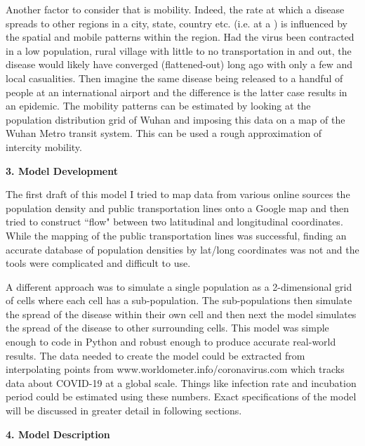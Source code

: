 \documentclass[a4paper]{article}
\begin{document}
Another factor to consider that 
is mobility. Indeed, the rate at which a disease spreads to other regions
in a city, state, country etc. (i.e. at a ) is influenced by the spatial 
and mobile patterns within the region. Had the virus been contracted in a low
population, rural village with little to no transportation in and out, the
disease would likely have converged (flattened-out) long ago with only a few 
and local casualities. Then imagine the same disease being released to a handful
of people at an international airport and the difference is the latter case
results in an epidemic. The mobility patterns can be estimated by looking at the
population distribution grid of Wuhan and imposing this data on a map of the
Wuhan Metro transit system. This can be used a rough approximation of intercity
mobility.

\begin{center}
  \textbf{3. Model Development}
\end{center}

The first draft of this model I tried to map data from various online sources the
population density and public transportation lines onto a Google map and then tried
to construct ``flow" between two latitudinal and longitudinal coordinates. While
the mapping of the public transportation lines was successful, finding an
accurate database of population densities by lat/long coordinates was not and
the tools were complicated and difficult to use. 

A different approach was to simulate a single population as a 2-dimensional grid
of cells where each cell has a sub-population. The sub-populations then simulate
the spread of the disease within their own cell and then next the model simulates
the spread of the disease to other surrounding cells. This model was simple
enough to code in Python and robust enough to produce accurate real-world
results. The data needed to create the model could be extracted from
interpolating points from www.worldometer.info/coronavirus.com which tracks data
about COVID-19 at a global scale. Things like infection rate and incubation
period could be estimated using these numbers. Exact specifications of the model will
be discussed in greater detail in following sections.

\begin{center}
  \textbf{4. Model Description}
\end{center}
\end{document}
